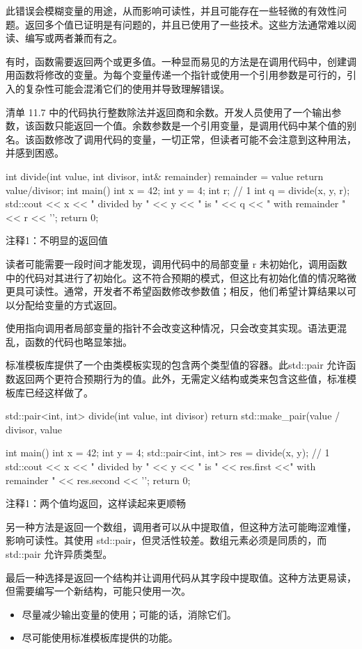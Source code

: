 此错误会模糊变量的用途，从而影响可读性，并且可能存在一些轻微的有效性问题。返回多个值已证明是有问题的，并且已使用了一些技术。这些方法通常难以阅读、编写或两者兼而有之。


有时，函数需要返回两个或更多值。一种显而易见的方法是在调用代码中，创建调用函数将修改的变量。为每个变量传递一个指针或使用一个引用参数是可行的，引入的复杂性可能会混淆它们的使用并导致理解错误。

清单 11.7 中的代码执行整数除法并返回商和余数。开发人员使用了一个输出参数，该函数只能返回一个值。余数参数是一个引用变量，是调用代码中某个值的别名。该函数修改了调用代码的变量，一切正常，但读者可能不会注意到这种用法，并感到困惑。


\begin{cpp}
int divide(int value, int divisor, int& remainder) {
  remainder = value %
  return value/divisor;
}
int main() {
  int x = 42;
  int y = 4;
  int r; // 1
  int q = divide(x, y, r);
  std::cout << x << " divided by " << y << " is " << q
    << " with remainder " << r << '\n';
  return 0;
}
\end{cpp}

{\footnotesize
注释1：不明显的返回值
}


读者可能需要一段时间才能发现，调用代码中的局部变量 r 未初始化，调用函数中的代码对其进行了初始化。这不符合预期的模式，但这比有初始化值的情况略微更具可读性。通常，开发者不希望函数修改参数值；相反，他们希望计算结果以可以分配给变量的方式返回。

使用指向调用者局部变量的指针不会改变这种情况，只会改变其实现。语法更混乱，函数的代码也略显笨拙。


标准模板库提供了一个由类模板实现的包含两个类型值的容器。此std::pair 允许函数返回两个更符合预期行为的值。此外，无需定义结构或类来包含这些值，标准模板库已经这样做了。


\begin{cpp}
std::pair<int, int> divide(int value, int divisor) {
  return std::make_pair(value / divisor, value %
}

int main() {
  int x = 42;
  int y = 4;
  std::pair<int, int> res = divide(x, y); // 1
  std::cout << x << " divided by " << y << " is " << res.first
    <<" with remainder " << res.second << '\n';
  return 0;
}
\end{cpp}

{\footnotesize
注释1：两个值均返回，这样读起来更顺畅
}

另一种方法是返回一个数组，调用者可以从中提取值，但这种方法可能晦涩难懂，影响可读性。其使用 std::pair，但灵活性较差。数组元素必须是同质的，而 std::pair 允许异质类型。

最后一种选择是返回一个结构并让调用代码从其字段中提取值。这种方法更易读，但需要编写一个新结构，可能只使用一次。


\begin{itemize}
\item
尽量减少输出变量的使用；可能的话，消除它们。

\item
尽可能使用标准模板库提供的功能。
\end{itemize}




